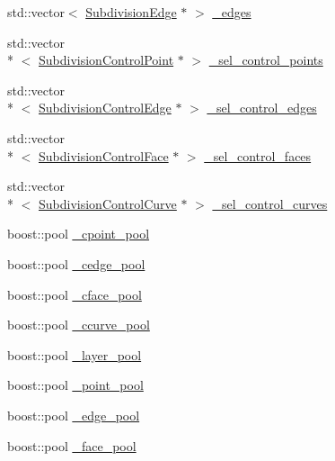 \begin{DoxyCompactItemize}
\item 
std\-::vector$<$ \hyperlink{classShipCAD_1_1SubdivisionEdge}{Subdivision\-Edge} $\ast$ $>$ \hyperlink{classShipCAD_1_1SubdivisionSurface_a709c44779394f03c06c16adba6187ecd}{\-\_\-edges}
\item 
std\-::vector\\*
$<$ \hyperlink{classShipCAD_1_1SubdivisionControlPoint}{Subdivision\-Control\-Point} $\ast$ $>$ \hyperlink{classShipCAD_1_1SubdivisionSurface_aefa02ffcdf17a06acd80f4274e509981}{\-\_\-sel\-\_\-control\-\_\-points}
\item 
std\-::vector\\*
$<$ \hyperlink{classShipCAD_1_1SubdivisionControlEdge}{Subdivision\-Control\-Edge} $\ast$ $>$ \hyperlink{classShipCAD_1_1SubdivisionSurface_a27011a827021fda5a4f2bb8828e157ca}{\-\_\-sel\-\_\-control\-\_\-edges}
\item 
std\-::vector\\*
$<$ \hyperlink{classShipCAD_1_1SubdivisionControlFace}{Subdivision\-Control\-Face} $\ast$ $>$ \hyperlink{classShipCAD_1_1SubdivisionSurface_a612889fd7e746cca042c63b2ab2cd110}{\-\_\-sel\-\_\-control\-\_\-faces}
\item 
std\-::vector\\*
$<$ \hyperlink{classShipCAD_1_1SubdivisionControlCurve}{Subdivision\-Control\-Curve} $\ast$ $>$ \hyperlink{classShipCAD_1_1SubdivisionSurface_aeac6a33f098ee8dadfc9482edc1a60a5}{\-\_\-sel\-\_\-control\-\_\-curves}
\item 
boost\-::pool \hyperlink{classShipCAD_1_1SubdivisionSurface_abd895a11906e0d5b5f8f4a5fc090b428}{\-\_\-cpoint\-\_\-pool}
\item 
boost\-::pool \hyperlink{classShipCAD_1_1SubdivisionSurface_a413da68890d958a7994d09e0906be102}{\-\_\-cedge\-\_\-pool}
\item 
boost\-::pool \hyperlink{classShipCAD_1_1SubdivisionSurface_a6bb58101a0ee9c4f06e1fdf86f0cded1}{\-\_\-cface\-\_\-pool}
\item 
boost\-::pool \hyperlink{classShipCAD_1_1SubdivisionSurface_ae20f94c83bac02bae90a905379765b0a}{\-\_\-ccurve\-\_\-pool}
\item 
boost\-::pool \hyperlink{classShipCAD_1_1SubdivisionSurface_a953485df23e6f7393868b436384debef}{\-\_\-layer\-\_\-pool}
\item 
boost\-::pool \hyperlink{classShipCAD_1_1SubdivisionSurface_a98af3f1b9fa4412756cadf4fe561f062}{\-\_\-point\-\_\-pool}
\item 
boost\-::pool \hyperlink{classShipCAD_1_1SubdivisionSurface_a7a7e25c91a06ca2b3f3d27a5ca310f08}{\-\_\-edge\-\_\-pool}
\item 
boost\-::pool \hyperlink{classShipCAD_1_1SubdivisionSurface_a2f746c1c19594b1baa03e9c49c9ffd0a}{\-\_\-face\-\_\-pool}
\end{DoxyCompactItemize}
